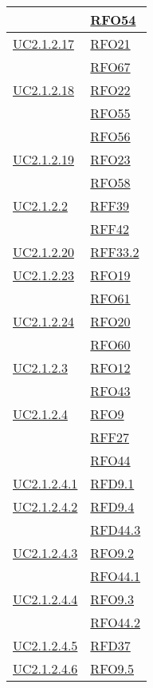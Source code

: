 \begin{longtable}{|>{\centering}m{5cm}|m{5cm}<{\centering}|}
	& \hyperlink{RFO54}{RFO54}\\ \hline
	\hyperlink{UC2.1.2.17}{UC2.1.2.17} & \hyperlink{RFO21}{RFO21}\\
	& \hyperlink{RFO67}{RFO67}\\ \hline
	\hyperlink{UC2.1.2.18}{UC2.1.2.18} & \hyperlink{RFO22}{RFO22}\\
	& \hyperlink{RFO55}{RFO55}\\
	& \hyperlink{RFO56}{RFO56}\\ \hline
	\hyperlink{UC2.1.2.19}{UC2.1.2.19} & \hyperlink{RFO23}{RFO23}\\
	& \hyperlink{RFO58}{RFO58}\\ \hline
	\hyperlink{UC2.1.2.2}{UC2.1.2.2} & \hyperlink{RFF39}{RFF39}\\
	& \hyperlink{RFF42}{RFF42}\\ \hline
	\hyperlink{UC2.1.2.20}{UC2.1.2.20} & \hyperlink{RFF33.2}{RFF33.2}\\ \hline
	\hyperlink{UC2.1.2.23}{UC2.1.2.23} & \hyperlink{RFO19}{RFO19}\\
	& \hyperlink{RFO61}{RFO61}\\ \hline
	\hyperlink{UC2.1.2.24}{UC2.1.2.24} & \hyperlink{RFO20}{RFO20}\\
	& \hyperlink{RFO60}{RFO60}\\ \hline
	\hyperlink{UC2.1.2.3}{UC2.1.2.3} & \hyperlink{RFO12}{RFO12}\\
	& \hyperlink{RFO43}{RFO43}\\ \hline
	\hyperlink{UC2.1.2.4}{UC2.1.2.4} & \hyperlink{RFO9}{RFO9}\\
	& \hyperlink{RFF27}{RFF27}\\
	& \hyperlink{RFO44}{RFO44}\\ \hline
	\hyperlink{UC2.1.2.4.1}{UC2.1.2.4.1} & \hyperlink{RFD9.1}{RFD9.1}\\ \hline
	\hyperlink{UC2.1.2.4.2}{UC2.1.2.4.2} & \hyperlink{RFD9.4}{RFD9.4}\\
	& \hyperlink{RFD44.3}{RFD44.3}\\ \hline
	\hyperlink{UC2.1.2.4.3}{UC2.1.2.4.3} & \hyperlink{RFO9.2}{RFO9.2}\\
	& \hyperlink{RFO44.1}{RFO44.1}\\ \hline
	\hyperlink{UC2.1.2.4.4}{UC2.1.2.4.4} & \hyperlink{RFO9.3}{RFO9.3}\\
	& \hyperlink{RFO44.2}{RFO44.2}\\ \hline
	\hyperlink{UC2.1.2.4.5}{UC2.1.2.4.5} & \hyperlink{RFD37}{RFD37}\\ \hline
	\hyperlink{UC2.1.2.4.6}{UC2.1.2.4.6} & \hyperlink{RFO9.5}{RFO9.5}\\ \hline

\end{longtable}
